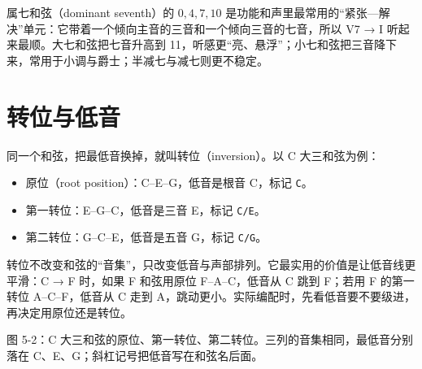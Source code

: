 属七和弦（dominant seventh）的 \(0,4,7,10\) 是功能和声里最常用的“紧张—解决”单元：它带着一个倾向主音的三音和一个倾向三音的七音，所以 V7 → I 听起来最顺。大七和弦把七音升高到 11，听感更“亮、悬浮”；小七和弦把三音降下来，常用于小调与爵士；半减七与减七则更不稳定。

\section{转位与低音}

同一个和弦，把最低音换掉，就叫转位（inversion）。以 C 大三和弦为例：

\begin{itemize}
  \item 原位（root position）：C–E–G，低音是根音 C，标记 \texttt{C}。
  \item 第一转位：E–G–C，低音是三音 E，标记 \texttt{C/E}。
  \item 第二转位：G–C–E，低音是五音 G，标记 \texttt{C/G}。
\end{itemize}

转位不改变和弦的“音集”，只改变低音与声部排列。它最实用的价值是让低音线更平滑：C → F 时，如果 F 和弦用原位 F–A–C，低音从 C 跳到 F；若用 F 的第一转位 A–C–F，低音从 C 走到 A，跳动更小。实际编配时，先看低音要不要级进，再决定用原位还是转位。

\begin{center}
\begin{minipage}{\linewidth}
\centering
{}

\small 图 5-2：C 大三和弦的原位、第一转位、第二转位。三列的音集相同，最低音分别落在 C、E、G；斜杠记号把低音写在和弦名后面。
\end{minipage}
\end{center}

